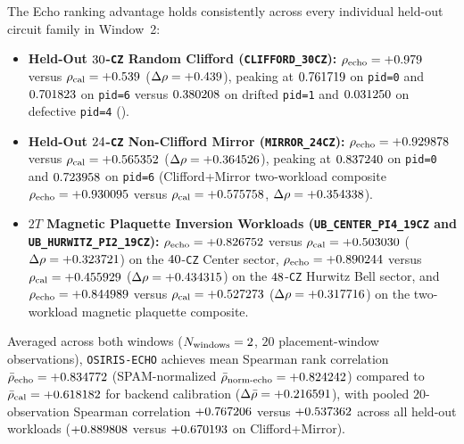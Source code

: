 \documentclass[aps,prx,twocolumn,superscriptaddress,nofootinbib]{revtex4-2}
\begin{document}
The Echo ranking advantage holds consistently across every individual held-out circuit family in Window~2:
\begin{itemize}
\item \textbf{Held-Out $30$-\texttt{CZ} Random Clifford (\texttt{CLIFFORD\_30CZ}):} $\rho_{\mathrm{echo}} = +0.979$ versus $\rho_{\mathrm{cal}} = +0.539$ ($\Delta\rho = +0.439$), peaking at $0.761719$ on \texttt{pid=0} and $0.701823$ on \texttt{pid=6} versus $0.380208$ on drifted \texttt{pid=1} and $0.031250$ on defective \texttt{pid=4} (\BTPlaqPidFourQubits).
\item \textbf{Held-Out $24$-\texttt{CZ} Non-Clifford Mirror (\texttt{MIRROR\_24CZ}):} $\rho_{\mathrm{echo}} = +0.929878$ versus $\rho_{\mathrm{cal}} = +0.565352$ ($\Delta\rho = +0.364526$), peaking at $0.837240$ on \texttt{pid=0} and $0.723958$ on \texttt{pid=6} (Clifford+Mirror two-workload composite $\rho_{\mathrm{echo}} = +0.930095$ versus $\rho_{\mathrm{cal}} = +0.575758$, $\Delta\rho = +0.354338$).
\item \textbf{$2T$ Magnetic Plaquette Inversion Workloads (\texttt{UB\_CENTER\_PI4\_19CZ} and \texttt{UB\_HURWITZ\_PI2\_19CZ}):} $\rho_{\mathrm{echo}} = +0.826752$ versus $\rho_{\mathrm{cal}} = +0.503030$ ($\Delta\rho = +0.323721$) on the $40$-\texttt{CZ} Center sector, $\rho_{\mathrm{echo}} = +0.890244$ versus $\rho_{\mathrm{cal}} = +0.455929$ ($\Delta\rho = +0.434315$) on the $48$-\texttt{CZ} Hurwitz Bell sector, and $\rho_{\mathrm{echo}} = +0.844989$ versus $\rho_{\mathrm{cal}} = +0.527273$ ($\Delta\rho = +0.317716$) on the two-workload magnetic plaquette composite.
\end{itemize}
Averaged across both windows ($N_{\mathrm{windows}} = 2$, $20$ placement-window observations), \texttt{OSIRIS-ECHO} achieves mean Spearman rank correlation $\bar{\rho}_{\mathrm{echo}} = +0.834772$ (SPAM-normalized $\bar{\rho}_{\mathrm{norm\text{-}echo}} = +0.824242$) compared to $\bar{\rho}_{\mathrm{cal}} = +0.618182$ for backend calibration ($\Delta\bar{\rho} = +0.216591$), with pooled $20$-observation Spearman correlation $+0.767206$ versus $+0.537362$ across all held-out workloads ($+0.889808$ versus $+0.670193$ on Clifford+Mirror).
\end{document}
